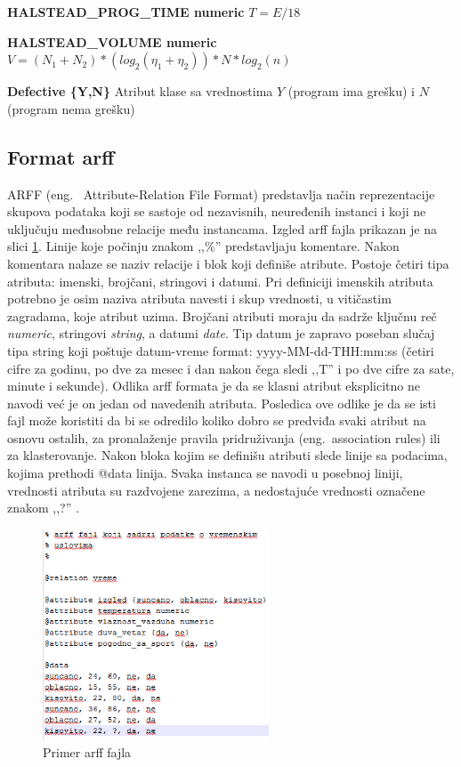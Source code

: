 \documentclass[12pt,oneside]{memoir}
\begin{document}
\textbf{HALSTEAD\_PROG\_TIME numeric} $T = E/18$

\textbf{HALSTEAD\_VOLUME numeric} $V = (N_1+N_2)*(log_2(\eta_1+\eta_2))*N*log_2(n)$

\textbf{Defective \{Y,N\} } Atribut klase sa vrednostima $Y$ (program ima grešku) i $N$ (program nema grešku)

\subsection{Format arff}
ARFF (eng.~ Attribute-Relation File Format) predstavlja način reprezentacije skupova podataka koji se sastoje od nezavisnih, neuređenih instanci i koji ne uključuju međusobne relacije među instancama. Izgled arff fajla prikazan je na slici \ref{fig:arff}. Linije koje počinju znakom ,,\%'' predstavljaju komentare. Nakon komentara nalaze se naziv relacije i blok koji definiše atribute. Postoje četiri tipa atributa: imenski, brojčani, stringovi i datumi. Pri definiciji imenskih atributa potrebno je osim naziva atributa navesti i skup vrednosti, u vitičastim zagradama, koje atribut uzima. Brojčani atributi moraju da sadrže ključnu reč \textit{numeric}, stringovi \textit{string}, a datumi \textit{date}. Tip datum je zapravo poseban slučaj tipa string koji poštuje datum-vreme format: yyyy-MM-dd-THH:mm:ss (četiri cifre za godinu, po dve za mesec i dan nakon čega sledi ,,T'' i po dve cifre za sate, minute i sekunde). Odlika arff formata je da se klasni atribut eksplicitno ne navodi već je on jedan od navedenih atributa. Posledica ove odlike je da se isti fajl može koristiti da bi se odredilo koliko dobro se predviđa svaki atribut na osnovu ostalih, za pronalaženje pravila pridruživanja (eng.~association rules) ili za klasterovanje. Nakon bloka kojim se definišu atributi slede linije sa podacima, kojima prethodi @data linija. Svaka instanca se navodi u posebnoj liniji, vrednosti atributa su razdvojene zarezima, a nedostajuće vrednosti označene znakom ,,?'' \cite{weka}. 

\begin{figure}[!ht]
  \centering
  \includegraphics[width=0.60\textwidth]{arff.png}
  \caption{Primer arff fajla}
  \label{fig:arff}
\end{figure}
\end{document}
